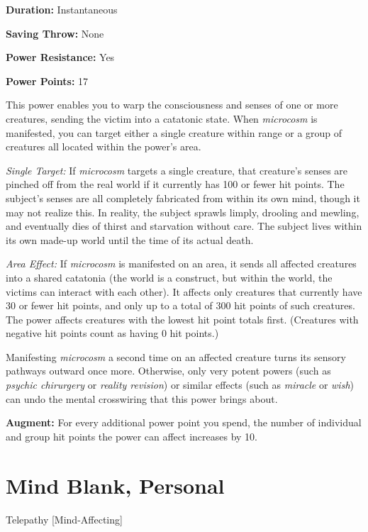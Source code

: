 \documentclass{article}
\begin{document}
\textbf{Duration:} Instantaneous

\textbf{Saving Throw:} None

\textbf{Power Resistance:} Yes

\textbf{Power Points:} 17

This power enables you to warp the consciousness and senses of one or more creatures, 
sending the victim into a catatonic state. When \textit{microcosm }is manifested, 
you can target either a single creature within range or a group of creatures all 
located within the power's area.

\textit{Single Target: }If \textit{microcosm }targets a single creature, that creature's 
senses are pinched off from the real world if it currently has 100 or fewer hit 
points. The subject's senses are all completely fabricated from within its own 
mind, though it may not realize this. In reality, the subject sprawls limply, drooling 
and mewling, and eventually dies of thirst and starvation without care. The subject 
lives within its own made-up world until the time of its actual death.

\textit{Area Effect: }If \textit{microcosm }is manifested on an area, it sends 
all affected creatures into a shared catatonia (the world is a construct, but within 
the world, the victims can interact with each other). It affects only creatures 
that currently have 30 or fewer hit points, and only up to a total of 300 hit points 
of such creatures. The power affects creatures with the lowest hit point totals 
first. (Creatures with negative hit points count as having 0 hit points.)

Manifesting \textit{microcosm }a second time on an affected creature turns its 
sensory pathways outward once more. Otherwise, only very potent powers (such as 
\textit{psychic chirurgery }or \textit{reality revision}) or similar effects (such 
as \textit{miracle }or \textit{wish}) can undo the mental crosswiring that this 
power brings about.

\textbf{Augment:} For every additional power point you spend, the number of individual 
and group hit points the power can affect increases by 10.

\vspace{12pt}
\section*{Mind Blank, Personal}

Telepathy [Mind-Affecting]
\end{document}
